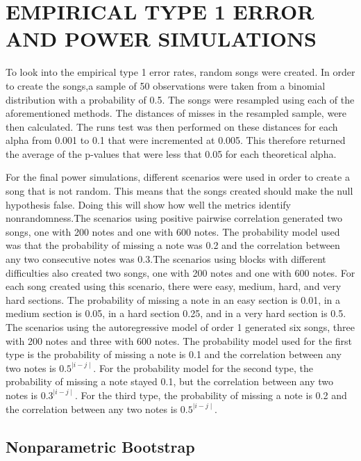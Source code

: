 \documentclass[12pt, letterpaper]{article}
\begin{document}
\section{EMPIRICAL TYPE 1 ERROR AND POWER SIMULATIONS}
To look into the empirical type 1 error rates, random songs were created. In order to create the songs,a sample of 50 observations were taken from a binomial distribution with a probability of 0.5. The songs were resampled using each of the aforementioned methods. The distances of misses in the resampled sample, were then calculated. The runs test was then performed on these distances for each alpha from 0.001 to 0.1 that were incremented at 0.005. This therefore returned the average of the p-values that were less that 0.05 for each theoretical alpha. 

For the final power simulations, different scenarios were used in order to create a song that is not random. This means that the songs created should make the null hypothesis false. Doing this will show how well the metrics identify nonrandomness.The scenarios using positive pairwise correlation generated two songs, one with 200 notes and one with 600 notes. The probability model used was that the probability of missing a note was 0.2 and the correlation between any two consecutive notes was 0.3.The scenarios using blocks with different difficulties also created two songs, one with 200 notes and one with 600 notes. For each song created using this scenario, there were easy, medium, hard, and very hard sections. The probability of missing a note in an easy section is 0.01, in a medium section is 0.05, in a hard section 0.25, and in a very hard section is 0.5. The scenarios using the autoregressive model of order 1 generated six songs, three with 200 notes and three with 600 notes. The probability model used for the first type is the probability of missing a note is 0.1 and the correlation between any two notes is $0.5^{\mid i-j \mid}$. For the probability model for the second type, the probability of missing a note stayed 0.1, but the correlation between any two notes is $0.3^{\mid i-j \mid}$. For the third type, the probability of missing a note is 0.2 and the correlation between any two notes is $0.5^{\mid i-j \mid}$.

\subsection{Nonparametric Bootstrap}
\end{document}
